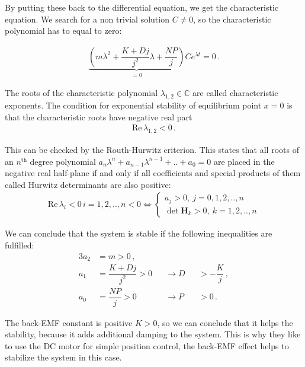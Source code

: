 \noindent
By putting these back to the differential equation, we get the characteristic equation. We search for a non trivial solution $C \neq 0$, so the characteristic polynomial has to equal to zero: 

\begin{align}
	 \underbrace{\left( m \lambda^2  +\dfrac{K+Dj}{j^2} \lambda + \dfrac{NP}{j} \right)}_{\displaystyle =0} Ce^{\lambda t} = 0\,.
\end{align}

\noindent
The roots of the characteristic polynomial $\lambda_{1,2} \in \mathbb C$ are called characteristic exponents. The condition for exponential stability of equilibrium point $x = 0$ is that the characteristic roots have negative real part
\begin{align}
	\mathrm{Re}\, \lambda_{1,2} < 0\,.
\end{align}

\noindent This can be checked by the Routh-Hurwitz criterion. This states that all roots of an $n^\mathrm{th} $ degree polynomial $a_n\lambda^n +a_{n-1}\lambda^{n-1} +..+a_0=0$ are placed in the negative real half-plane if and only if all coefficients and special products of them called Hurwitz determinants are also positive: 
\begin{align}
	\mathrm{Re}\, \lambda_{i} < 0\, i=1,2,..,n < 0 \iff \begin{cases}
		a_j > 0,\ j = 0,1,2,..,n \\
		\det \mathbf{H}_k >0, \ k = 1,2,..,n 
	\end{cases}
\end{align}

\noindent We can conclude that the system is stable if the following inequalities are fulfilled:
\begin{alignat}{3}
	a_2&=m>0 \,,				\\
	a_1&=\dfrac{K+Dj}{j^2}>0 &&\rightarrow D&&>-\dfrac{K}{j}\,, \label{eq:motor_D_condition} \\
	a_0&=\dfrac{NP}{j}>0	 &&\rightarrow P&&>0 \,.
\end{alignat}
	
\noindent 
The back-EMF constant is positive $K>0$, so we can conclude that it helps the stability, because it adds additional damping to the system. This is why they like to use the DC motor for simple position control, the back-EMF effect helps to stabilize the system in this case.

